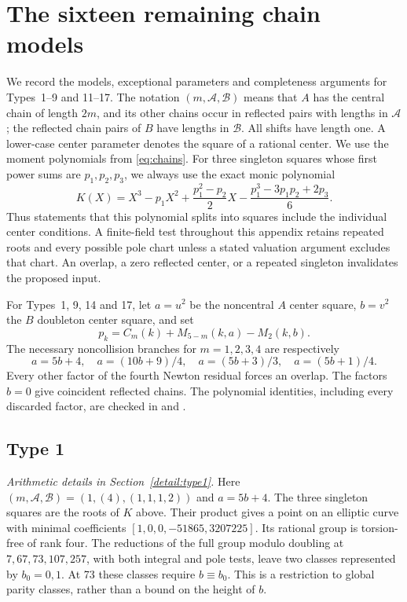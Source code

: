\section{The sixteen remaining chain models}\label{app:cases}

We record the models, exceptional parameters and completeness arguments for
Types~1--9 and 11--17. The notation $(m,\mathcal A,\mathcal B)$ means that
$A$ has the central chain of length $2m$, and its other chains occur in
reflected pairs with lengths in $\mathcal A$; the reflected chain pairs
of $B$ have lengths in $\mathcal B$. All shifts have length one. A lower-case
center parameter denotes the square of a rational center. We use the moment polynomials from \eqref{eq:chains}.
For three singleton squares whose first power sums are $p_1,p_2,p_3$,
we always use the exact monic polynomial
\[
 K(X)=X^3-p_1X^2+\frac{p_1^2-p_2}{2}X
       -\frac{p_1^3-3p_1p_2+2p_3}{6}.
\]
Thus statements that this polynomial splits into squares include the
individual center conditions. A finite-field test throughout this appendix
retains repeated roots and every possible pole chart unless a stated
valuation argument excludes that chart. An overlap, a zero reflected center,
or a repeated singleton invalidates the proposed input.

For Types~1, 9, 14 and 17, let $a=u^2$ be the noncentral $A$ center
square, $b=v^2$ the $B$ doubleton center square, and set
\[
 p_k=C_m(k)+M_{5-m}(k,a)-M_2(k,b).
\]
The necessary noncollision branches for $m=1,2,3,4$ are respectively
\[
 a=5b+4,\quad a=(10b+9)/4,\quad a=(5b+3)/3,\quad a=(5b+1)/4.
\]
Every other factor of the fourth Newton residual forces an overlap.
The factors $b=0$ give coincident reflected chains. The polynomial identities,
including every discarded factor, are checked in
 and .

\subsection{Type 1}\label{app:type1}
\noindent\emph{Arithmetic details in Section~\ref{detail:type1}.}\enspace
Here $(m,\mathcal A,\mathcal B)=(1,(4),(1,1,1,2))$ and $a=5b+4$.
The three singleton squares are the roots of $K$ above. Their product gives
a point on an elliptic curve with minimal coefficients
$[1,0,0,-51865,3207225]$. Its rational group is torsion-free of rank four.
The reductions of the full group modulo doubling at $7,67,73,107,257$,
with both integral and pole tests, leave two classes represented by $b_0=0,1$.
At 73 these classes require $b\equiv b_0$. This is a restriction to global
parity classes, rather than a bound on the height of $b$.

